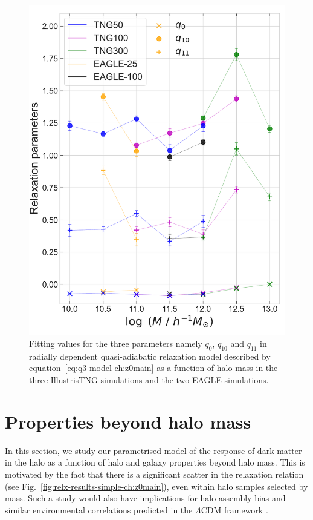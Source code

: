 \begin{figure}
    \centering
    \includegraphics[width=.7\linewidth]{plots/fit_param_q3s_M_TE.pdf}
    \caption{Fitting values for the three parameters namely $q_{0}$, $q_{10}$ and $q_{11}$ in radially dependent quasi-adiabatic relaxation model described by equation~\ref{eq:q3-model-ch:z0main} as a function of halo mass in the three IllustrisTNG simulations and the two EAGLE simulations.}
    \label{fig:3-param-mass-only-ch:z0main}
\end{figure}


\section{Properties beyond halo mass}
\label{sec:dep-on-hal-gal-props-ch:z0main}
In this section, we study our parametrised model of the response of dark matter in the halo as a function of halo and galaxy properties beyond halo mass. This is motivated by the fact that there is a significant scatter in the relaxation relation (see Fig.~\ref{fig:relx-results-simple-ch:z0main}), even within halo samples selected by mass. Such a study would also have implications for halo assembly bias and similar environmental correlations predicted in the $\Lambda$CDM framework  \citep[see, e.g., the discussion in][]{2021arXiv211200026P}. 


